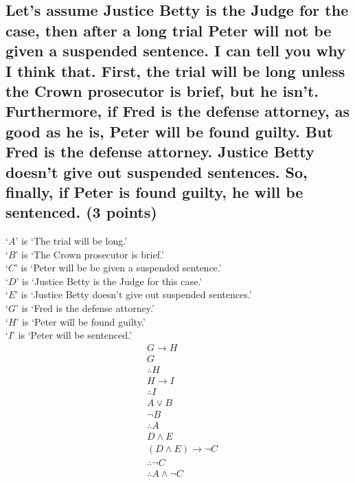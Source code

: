 \documentclass[10pt, letterpaper, titlepage]{article}
\begin{document}
        \subsection{Let’s assume Justice Betty is the Judge for the case, then after a long trial Peter
            will not be given a suspended sentence. I can tell you why I think that. First, the
            trial will be long unless the Crown prosecutor is brief, but he isn’t. Furthermore,
            if Fred is the defense attorney, as good as he is, Peter will be found guilty. But
            Fred is the defense attorney. Justice Betty doesn’t give out suspended sentences.
            So, finally, if Peter is found guilty, he will be sentenced. (3 points)}
            `$A$' is `The trial will be long.'\\
            `$B$' is `The Crown prosecutor is brief.'\\
            `$C$' is `Peter will be be given a suspended sentence.'\\
            `$D$' is `Justice Betty is the Judge for this case.'\\
            `$E$' is `Justice Betty doesn't give out suspended sentences.'\\
            `$G$' is `Fred is the defense attorney.'\\
            `$H$' is `Peter will be found guilty.'\\
            `$I$' is `Peter will be sentenced.'
            \begin{align*}
                &G \to H\\
                &G\\
                &\therefore H\\
                &H \to I\\
                &\therefore I\\
                &A \lor B\\
                &\lnot B\\
                &\therefore A\\
                &D \land E\\
                &(D \land E) \to \lnot C\\
                &\therefore \lnot C\\
                &\therefore A \land \lnot C
            \end{align*}

        \newpage
\end{document}

